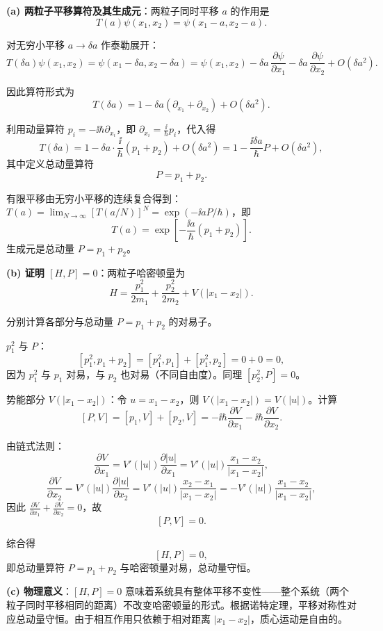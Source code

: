 \begin{solution}
	\textbf{(a) 两粒子平移算符及其生成元}：两粒子同时平移 $a$ 的作用是
	\[
	T(a)\psi(x_1,x_2)=\psi(x_1-a,x_2-a).
	\]

	对无穷小平移 $a\to\delta a$ 作泰勒展开：
	\[
	T(\delta a)\psi(x_1,x_2)=\psi(x_1-\delta a,x_2-\delta a)
	=\psi(x_1,x_2)-\delta a\,\frac{\partial\psi}{\partial x_1}-\delta a\,\frac{\partial\psi}{\partial x_2}+O(\delta a^2).
	\]

	因此算符形式为
	\[
	T(\delta a)=1-\delta a(\partial_{x_1}+\partial_{x_2})+O(\delta a^2).
	\]

	利用动量算符 $p_i=-\ii\hbar\partial_{x_i}$，即 $\partial_{x_i}=\frac{\ii}{\hbar}p_i$，代入得
	\[
	T(\delta a)=1-\delta a\cdot\frac{\ii}{\hbar}(p_1+p_2)+O(\delta a^2)
	=1-\frac{\ii\delta a}{\hbar}P+O(\delta a^2),
	\]
	其中定义总动量算符
	\[
	P=p_1+p_2.
	\]

	有限平移由无穷小平移的连续复合得到：$T(a)=\lim_{N\to\infty}[T(a/N)]^N=\exp(-\ii a P/\hbar)$，即
	\[
	\boxed{T(a)=\exp\!\left[-\frac{\ii a}{\hbar}(p_1+p_2)\right]}.
	\]
	生成元是总动量 $P=p_1+p_2$。

	\textbf{(b) 证明 $[H,P]=0$}：两粒子哈密顿量为
	\[
	H=\frac{p_1^2}{2m_1}+\frac{p_2^2}{2m_2}+V(|x_1-x_2|).
	\]

	分别计算各部分与总动量 $P=p_1+p_2$ 的对易子。

	$p_1^2$ 与 $P$：
	\[
	[p_1^2,p_1+p_2]=[p_1^2,p_1]+[p_1^2,p_2]=0+0=0,
	\]
	因为 $p_1^2$ 与 $p_1$ 对易，与 $p_2$ 也对易（不同自由度）。同理 $[p_2^2,P]=0$。

	势能部分 $V(|x_1-x_2|)$：令 $u=x_1-x_2$，则 $V(|x_1-x_2|)=V(|u|)$。计算
	\[
	[P,V]=[p_1,V]+[p_2,V]=-\ii\hbar\frac{\partial V}{\partial x_1}-\ii\hbar\frac{\partial V}{\partial x_2}.
	\]

	由链式法则：
	\[
	\frac{\partial V}{\partial x_1}=V'(|u|)\frac{\partial |u|}{\partial x_1}=V'(|u|)\frac{x_1-x_2}{|x_1-x_2|},
	\]
	\[
	\frac{\partial V}{\partial x_2}=V'(|u|)\frac{\partial |u|}{\partial x_2}=V'(|u|)\frac{x_2-x_1}{|x_1-x_2|}=-V'(|u|)\frac{x_1-x_2}{|x_1-x_2|},
	\]
	因此 $\frac{\partial V}{\partial x_1}+\frac{\partial V}{\partial x_2}=0$，故
	\[
	[P,V]=0.
	\]

	综合得
	\[
	[H,P]=0,
	\]
	即总动量算符 $P=p_1+p_2$ 与哈密顿量对易，总动量守恒。

	\textbf{(c) 物理意义}：$[H,P]=0$ 意味着系统具有整体平移不变性——整个系统（两个粒子同时平移相同的距离）不改变哈密顿量的形式。根据诺特定理，平移对称性对应总动量守恒。由于相互作用只依赖于相对距离 $|x_1-x_2|$，质心运动是自由的。
	\end{solution}

